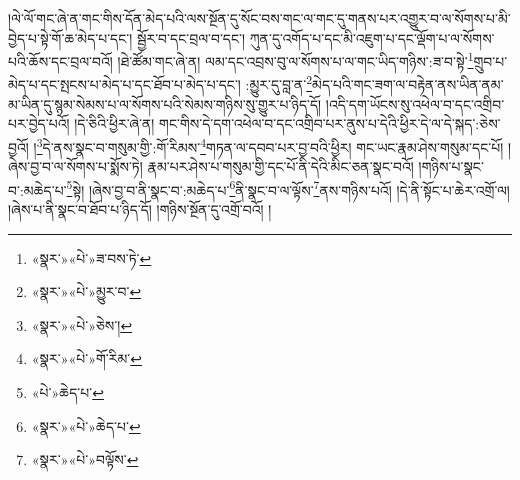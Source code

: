 །ལེ་ལོ་གང་ཞེ་ན་གང་གིས་དོན་མེད་པའི་ལས་སྔོན་དུ་སོང་བས་གང་ལ་གང་དུ་གནས་པར་འགྱུར་བ་ལ་སོགས་པ་མི་བྱེད་པ་སྟེ་གོ་ཆ་མེད་པ་དང་། སྦྱོར་བ་དང་བྲལ་བ་དང་། ཀུན་དུ་འགོད་པ་དང་མི་འཇུག་པ་དང་ལྡོག་པ་ལ་སོགས་པའི་ཆོས་དང་བྲལ་བའོ། །ཐེ་ཚོམ་གང་ཞེ་ན། ལམ་དང་འབྲས་བུ་ལ་སོགས་པ་ལ་གང་ཡིད་གཉིས་:ཟ་བ་སྟེ་\footnote{«སྣར་»«པེ་»ཟ་བས་ཏེ་}གྲུབ་པ་མེད་པ་དང་སྤངས་པ་མེད་པ་དང་ཐོབ་པ་མེད་པ་དང་། :མྱུར་དུ་བླ་ན་\footnote{«སྣར་»«པེ་»མྱུར་བ་}མེད་པའི་གང་ཟག་ལ་བརྟེན་ནས་ཡིན་ནམ་མ་ཡིན་དུ་སྙམ་སེམས་པ་ལ་སོགས་པའི་སེམས་གཉིས་སུ་གྱུར་པ་ཉིད་དོ། །འདི་དག་ཡོངས་སུ་འཕེལ་བ་དང་འགྲིབ་པར་བྱེད་པའོ། །དེ་ཅིའི་ཕྱིར་ཞེ་ན། གང་གིས་དེ་དག་འཕེལ་བ་དང་འགྲིབ་པར་ནུས་པ་དེའི་ཕྱིར་དེ་ལ་དེ་སྐད་:ཅེས་བྱའོ། །\footnote{«སྣར་»«པེ་»ཅེས་།}དེ་ནས་སྣང་བ་གསུམ་གྱི་:གོ་རིམས་\footnote{«སྣར་»«པེ་»གོ་རིམ་}གཏན་ལ་དབབ་པར་བྱ་བའི་ཕྱིར། གང་ཡང་རྣམ་ཤེས་གསུམ་དང་པོ། །ཞེས་བྱ་བ་ལ་སོགས་པ་སྨོས་ཏེ། རྣམ་པར་ཤེས་པ་གསུམ་གྱི་དང་པོ་ནི་དེའི་མིང་ཅན་སྣང་བའོ། །གཉིས་པ་སྣང་བ་:མཆེད་པ་\footnote{«པེ་»ཆེད་པ་}སྟེ། །ཞེས་བྱ་བ་ནི་སྣང་བ་:མཆེད་པ་\footnote{«སྣར་»«པེ་»ཆེད་པ་}ནི་སྣང་བ་ལ་ལྟོས་\footnote{«སྣར་»«པེ་»བལྟོས་}ནས་གཉིས་པའོ། །དེ་ནི་སྟོང་པ་ཆེར་འགྲོ་ལ། །ཞེས་པ་ནི་སྣང་བ་ཐོབ་པ་ཉིད་དོ། །གཉིས་སྔོན་དུ་འགྲོ་བའོ། །
